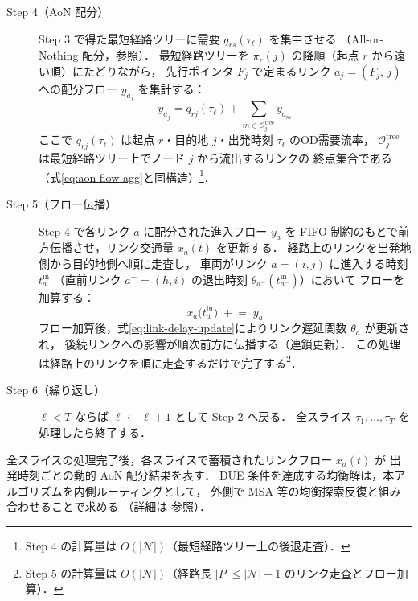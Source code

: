 \begin{description}
  \item[\textsf{Step 4}（AoN 配分）]
    Step 3 で得た最短経路ツリーに需要 $q_{rs}(\tau_\ell)$ を集中させる
    （All-or-Nothing 配分，参照）．
    最短経路ツリーを $\pi_r(j)$ の降順（起点 $r$ から遠い順）にたどりながら，
    先行ポインタ $F_j$ で定まるリンク $a_j = (F_j,\, j)$ への配分フロー $y_{a_j}$ を集計する：
    \begin{equation}
      y_{a_j} = q_{rj}(\tau_\ell)
                + \sum_{m \in \mathcal{O}_j^{\mathrm{tree}}} y_{a_m}
      \label{eq:dta-aon-agg}
    \end{equation}
    ここで $q_{rj}(\tau_\ell)$ は起点 $r$・目的地 $j$・出発時刻 $\tau_\ell$ のOD需要流率，
    $\mathcal{O}_j^{\mathrm{tree}}$ は最短経路ツリー上でノード $j$ から流出するリンクの
    終点集合である（式\eqref{eq:aon-flow-agg}と同構造）\footnote{Step 4 の計算量は $O(|\mathcal{N}|)$（最短経路ツリー上の後退走査）．}．

  \item[\textsf{Step 5}（フロー伝播）]
    Step 4 で各リンク $a$ に配分された進入フロー $y_a$ を
    FIFO 制約のもとで前方伝播させ，リンク交通量 $x_a(t)$ を更新する．
    経路上のリンクを出発地側から目的地側へ順に走査し，
    車両がリンク $a=(i,j)$ に進入する時刻 $t_a^{\mathrm{in}}$
    （直前リンク $a^-=(h,i)$ の退出時刻 $\theta_{a^-}(t_{a^-}^{\mathrm{in}})$）において
    フローを加算する：
    \begin{equation}
      x_a\!\bigl(t_a^{\mathrm{in}}\bigr) \;\mathrel{+}=\; y_a
      \label{eq:flow-update}
    \end{equation}
    フロー加算後，式\eqref{eq:link-delay-update}によりリンク遅延関数 $\theta_a$ が更新され，
    後続リンクへの影響が順次前方に伝播する（連鎖更新）．
    この処理は経路上のリンクを順に走査するだけで完了する\footnote{Step 5 の計算量は $O(|\mathcal{N}|)$（経路長 $|P| \leq |\mathcal{N}|-1$ のリンク走査とフロー加算）．}．

  \item[\textsf{Step 6}（繰り返し）]
    $\ell < T$ ならば $\ell \leftarrow \ell + 1$ として \textsf{Step 2} へ戻る．
    全スライス $\tau_1, \ldots, \tau_T$ を処理したら終了する．
\end{description}

全スライスの処理完了後，各スライスで蓄積されたリンクフロー $x_a(t)$ が
出発時刻ごとの動的 AoN 配分結果を表す．
DUE 条件を達成する均衡解は，本アルゴリズムを内側ルーティングとして，
外側で MSA 等の均衡探索反復と組み合わせることで求める
（詳細は  参照）．

